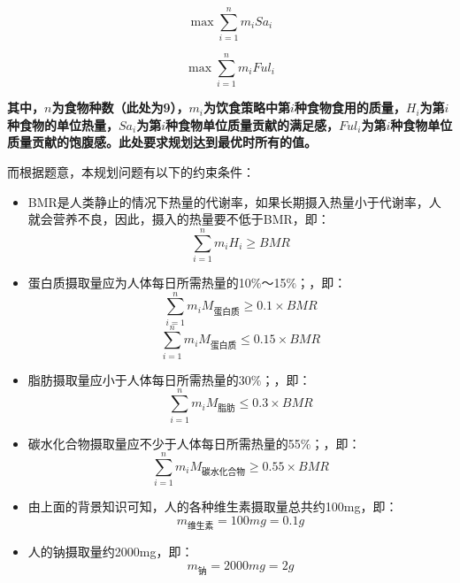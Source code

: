\documentclass{SYSUReport}
\begin{document}
\begin{equation}
\max \sum_{i=1}^{n} m_i Sa_i
\end{equation}

\begin{equation}
\max \sum_{i=1}^{n} m_i Ful_i
\end{equation}

\textbf{其中，$n$为食物种数（此处为9），$m_i$为饮食策略中第$i$种食物食用的质量，$H_i$为第$i$种食物的单位热量，$Sa_i$为第$i$种食物单位质量贡献的满足感，$Ful_i$为第$i$种食物单位质量贡献的饱腹感。此处要求规划达到最优时所有的值。}

而根据题意，本规划问题有以下的约束条件：
\begin{itemize}
    \item BMR是人类静止的情况下热量的代谢率，如果长期摄入热量小于代谢率，人就会营养不良，因此，摄入的热量要不低于BMR，即：
\begin{equation*}
\sum_{i=1}^{n} m_i H_i \geq BMR
\end{equation*}        \vspace{-0.1cm}
    \item 蛋白质摄取量应为人体每日所需热量的10$\%$～15$\%$；，即：
\begin{equation*}
\sum_{i=1}^{n} m_i M_\text{蛋白质} \geq 0.1 \times BMR
\end{equation*}
\begin{equation*}
\sum_{i=1}^{n} m_i M_\text{蛋白质} \leq 0.15 \times BMR
\end{equation*}        \vspace{-0.1cm}
    \item 脂肪摄取量应小于人体每日所需热量的30$\%$；，即：
\begin{equation*}
\sum_{i=1}^{n} m_i M_\text{脂肪} \leq 0.3 \times BMR
\end{equation*}        \vspace{-0.1cm}
    \item 碳水化合物摄取量应不少于人体每日所需热量的55$\%$；，即：
\begin{equation*}
\sum_{i=1}^{n} m_i M_\text{碳水化合物} \geq 0.55 \times BMR
\end{equation*}        \vspace{-0.1cm}
    \item 由上面的背景知识可知，人的各种维生素摄取量总共约100mg，即：
\begin{equation*}
m_\text{维生素} = 100mg = 0.1g
\end{equation*}
    \item 人的钠摄取量约2000mg，即：
\begin{equation*}
m_\text{钠} = 2000mg = 2g
\end{equation*}        \vspace{-0.1cm}
\end{itemize}
\end{document}
